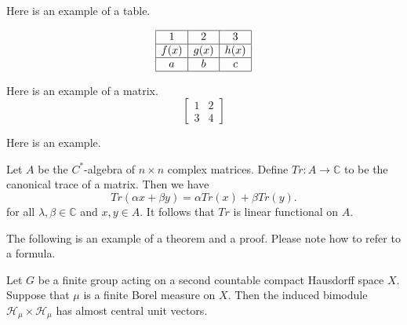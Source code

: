 \documentclass[12pt, reqno]{amsart}
\numberwithin{equation}{section}
\begin{document}

Here is an example of a table.

\begin{table}[ht]
\caption{}\label{eqtable}
\renewcommand\arraystretch{1.5}
\noindent\[
\begin{array}{|c|c|c|}
\hline
1&2&3\\
\hline f(x)&g(x)&h(x)\\
\hline a&b&c\\
\hline
\end{array}
\]
\end{table}

Here is an example of a matrix.
\begin{equation*}
\begin{bmatrix}
1 & 2 \\
3 &  4
\end{bmatrix}
\end{equation*}


Here is an example.


\begin{example} Let $A$ be the $C^*$-algebra of $n\times n$ complex matrices. Define $Tr: A\rightarrow \mathbb{C}$ to be the canonical trace of a matrix. Then we have
\begin{equation}\label{2.1}
Tr(\alpha x+\beta y)=\alpha Tr(x)+\beta Tr(y).
\end{equation}
for all $\lambda ,\beta \in  \mathbb{C}$ and $x,y\in A$. It follows that $Tr$ is linear functional on $A$.
\end{example}


The following is an example of a theorem and a proof. Please note how to refer to a formula.


\begin{theorem}\label{theo1}
Let $G$ be a finite group acting on a second countable compact Hausdorff space $X$. Suppose that $\mu$ is a finite Borel measure on $X$. Then the induced bimodule $\mathcal{H}_\mu\times \mathcal{H}_\mu$ has almost central unit vectors.
\end{theorem}
\end{document}
